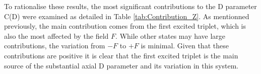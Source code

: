 \documentclass[10pt]{report}
\numberwithin{equation}{section}
\begin{document}
To rationalise these results, the most significant contributions to the D parameter C(D) were examined as detailed in Table \ref{tab:Contribution_Z}.
As mentionned previously, the main contribution comes from the first excited triplet, which is also the most affected by the field $F$.
While other states may have large contributions, the variation from $-F$ to $+F$ is minimal. 
Given that these contributions are positive it is clear that the first excited triplet is the main source of the substantial axial D parameter and its variation in this system.


\begin{table}[h]
    \centering
\end{table}
\end{document}
